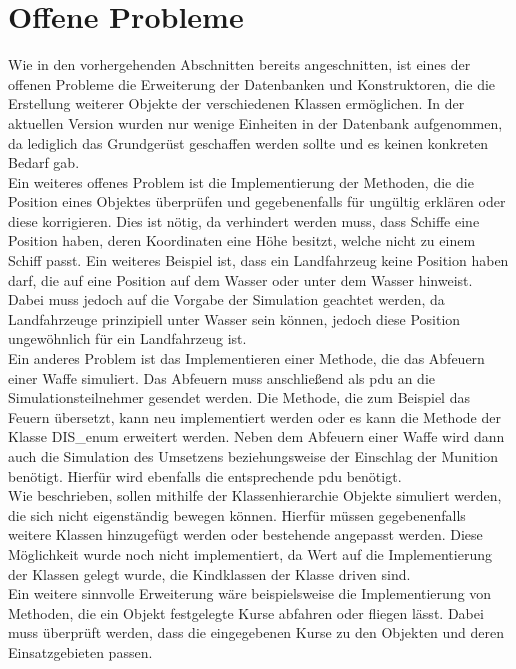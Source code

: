 \section{Offene Probleme}\label{prob}
Wie in den vorhergehenden Abschnitten bereits angeschnitten, ist eines der offenen Probleme die Erweiterung der Datenbanken und Konstruktoren, die die Erstellung weiterer Objekte der verschiedenen Klassen ermöglichen. In der aktuellen Version wurden nur wenige Einheiten in der Datenbank aufgenommen, da lediglich das Grundgerüst geschaffen werden sollte und es keinen konkreten Bedarf gab. \\
Ein weiteres offenes Problem ist die Implementierung der Methoden, die die Position eines Objektes überprüfen und gegebenenfalls für ungültig erklären oder diese korrigieren.  Dies ist nötig, da verhindert werden muss, dass Schiffe eine Position haben, deren Koordinaten eine Höhe besitzt, welche nicht zu einem Schiff passt. Ein weiteres Beispiel ist, dass ein Landfahrzeug  keine Position haben darf, die auf eine Position auf dem Wasser oder unter dem Wasser hinweist. Dabei muss jedoch auf die Vorgabe der Simulation geachtet werden, da Landfahrzeuge prinzipiell unter Wasser sein können, jedoch diese Position ungewöhnlich für ein Landfahrzeug ist.\\
Ein anderes Problem ist das Implementieren einer Methode, die das Abfeuern einer Waffe simuliert. Das Abfeuern muss anschließend als \ac{pdu} an die Simulationsteilnehmer gesendet werden. Die Methode, die zum Beispiel das Feuern übersetzt, kann neu implementiert werden oder es kann die Methode der Klasse \glqq DIS\_enum\grqq{} erweitert werden. Neben dem Abfeuern einer Waffe wird dann auch die Simulation des Umsetzens beziehungsweise der Einschlag der Munition benötigt. Hierfür wird ebenfalls die entsprechende  \ac{pdu} benötigt.\\
Wie beschrieben, sollen mithilfe der Klassenhierarchie Objekte simuliert werden, die sich nicht eigenständig bewegen können. Hierfür müssen gegebenenfalls weitere Klassen hinzugefügt werden oder bestehende angepasst werden. Diese Möglichkeit wurde noch nicht implementiert, da Wert auf die Implementierung der Klassen gelegt wurde, die Kindklassen der Klasse  \glqq driven\grqq{} sind. \\
Ein weitere sinnvolle Erweiterung wäre beispielsweise die Implementierung von Methoden, die ein Objekt festgelegte Kurse abfahren oder fliegen lässt. Dabei muss überprüft werden, dass die eingegebenen Kurse zu den Objekten und deren Einsatzgebieten passen. 
